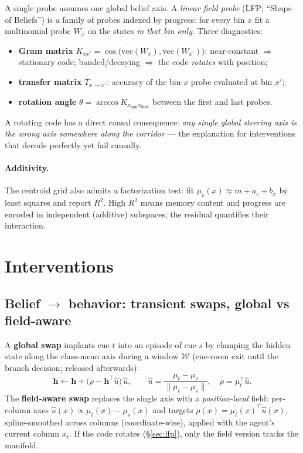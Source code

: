 \documentclass[11pt]{article}
\newcommand{\h}{\bm{h}}
\begin{document}
A single probe assumes one global belief axis. A \emph{linear field probe}
(LFP; ``Shape of Beliefs'') is a family of probes indexed by progress: for
every bin $x$ fit a multinomial probe $W_x$ on the states \emph{in that bin
only}. Three diagnostics:
\begin{itemize}
  \item \textbf{Gram matrix} $K_{xx'} = \cos\big(\mathrm{vec}(W_x),
        \mathrm{vec}(W_{x'})\big)$: near-constant $\Rightarrow$ stationary
        code; banded/decaying $\Rightarrow$ the code \emph{rotates} with
        position;
  \item \textbf{transfer matrix} $T_{x\to x'}$: accuracy of the bin-$x$ probe
        evaluated at bin $x'$;
  \item \textbf{rotation angle} $\theta = \arccos K_{x_{\min} x_{\max}}$
        between the first and last probes.
\end{itemize}
A rotating code has a direct causal consequence: \emph{any single global
steering axis is the wrong axis somewhere along the corridor} --- the
explanation for interventions that decode perfectly yet fail causally.

\paragraph{Additivity.} The centroid grid also admits a factorization test:
fit $\mu_c(x) \approx m + a_c + b_x$ by least squares and report $R^2$. High
$R^2$ means memory content and progress are encoded in independent (additive)
subspaces; the residual quantifies their interaction.

\section{Interventions}
\label{sec:interventions}

\subsection{Belief $\to$ behavior: transient swaps, global vs field-aware}

A \textbf{global swap} implants cue $t$ into an episode of cue $s$ by clamping
the hidden state along the class-mean axis during a window $\mathcal W$
(cue-room exit until the branch decision; released afterwards):
\begin{equation}
  \h \leftarrow \h + \big(\rho - \h^\top \hat u\big)\,\hat u,
  \qquad
  \hat u = \frac{\mu_t - \mu_s}{\lVert \mu_t - \mu_s\rVert},\quad
  \rho = \mu_t^\top \hat u .
\end{equation}
The \textbf{field-aware swap} replaces the single axis with a
\emph{position-local} field: per-column axes
$\hat u(x) \propto \mu_t(x) - \mu_s(x)$ and targets
$\rho(x) = \mu_t(x)^\top \hat u(x)$, spline-smoothed across columns
(coordinate-wise), applied with the agent's current column $x_t$. If the code
rotates (\S\ref{sec:lfp}), only the field version tracks the manifold.
\end{document}
